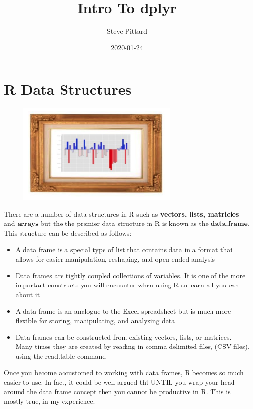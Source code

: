 \documentclass[]{book}
\title{Intro To dplyr}
\author{Steve Pittard}
\date{2020-01-24}
\begin{document}
\maketitle

{
\setcounter{tocdepth}{1}
\tableofcontents
}
\chapter{R Data Structures}\label{r-data-structures}

\begin{figure}
\centering
\includegraphics[width=3.12500in]{./figures/dframe.png}
\caption{}
\end{figure}

There are a number of data structures in R such as \textbf{vectors,
lists, matricies} and \textbf{arrays} but the the premier data structure
in R is known as the \textbf{data.frame}. This structure can be
described as follows:

\begin{itemize}
\item
  A data frame is a special type of list that contains data in a format
  that allows for easier manipulation, reshaping, and open-ended
  analysis
\item
  Data frames are tightly coupled collections of variables. It is one of
  the more important constructs you will encounter when using R so learn
  all you can about it
\item
  A data frame is an analogue to the Excel spreadsheet but is much more
  flexible for storing, manipulating, and analyzing data
\item
  Data frames can be constructed from existing vectors, lists, or
  matrices. Many times they are created by reading in comma delimited
  files, (CSV files), using the read.table command
\end{itemize}

Once you become accustomed to working with data frames, R becomes so
much easier to use. In fact, it could be well argued tht UNTIL you wrap
your head around the data frame concept then you cannot be productive in
R. This is mostly true, in my experience.
\end{document}
